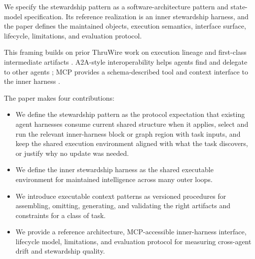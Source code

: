 \documentclass{article}
\begin{document}
We specify the stewardship pattern as a software-architecture pattern and state-model specification. Its reference realization is an inner stewardship harness, and the paper defines the maintained objects, execution semantics, interface surface, lifecycle, limitations, and evaluation protocol.

This framing builds on prior ThruWire work on execution lineage and first-class intermediate artifacts \cite{rosen2026lineage,rosen2026artifacts}. A2A-style interoperability helps agents find and delegate to other agents \cite{a2a2026spec}; MCP provides a schema-described tool and context interface to the inner harness \cite{mcp2025intro,mcp2025tools,mcp2025resources,mcp2025prompts}.

The paper makes four contributions:
\begin{itemize}[leftmargin=*, topsep=4pt, itemsep=3pt, parsep=0pt, partopsep=0pt]
\item We define the stewardship pattern as the protocol expectation that existing agent harnesses consume current shared structure when it applies, select and run the relevant inner-harness block or graph region with task inputs, and keep the shared execution environment aligned with what the task discovers, or justify why no update was needed.
\item We define the inner stewardship harness as the shared executable environment for maintained intelligence across many outer loops.
\item We introduce executable context patterns as versioned procedures for assembling, omitting, generating, and validating the right artifacts and constraints for a class of task.
\item We provide a reference architecture, MCP-accessible inner-harness interface, lifecycle model, limitations, and evaluation protocol for measuring cross-agent drift and stewardship quality.
\end{itemize}
\end{document}
